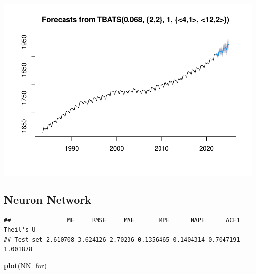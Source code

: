 \documentclass[
]{article}
\newenvironment{Shaded}{\begin{snugshade}}{\end{snugshade}}
\newcommand{\AttributeTok}[1]{\textcolor[rgb]{0.13,0.29,0.53}{#1}}
\newcommand{\DecValTok}[1]{\textcolor[rgb]{0.00,0.00,0.81}{#1}}
\newcommand{\FunctionTok}[1]{\textcolor[rgb]{0.13,0.29,0.53}{\textbf{#1}}}
\newcommand{\NormalTok}[1]{#1}
\newcommand{\OtherTok}[1]{\textcolor[rgb]{0.56,0.35,0.01}{#1}}
\newcommand{\SpecialCharTok}[1]{\textcolor[rgb]{0.81,0.36,0.00}{\textbf{#1}}}
\begin{document}
\includegraphics{Methane_Forecasting_files/figure-latex/unnamed-chunk-13-2.pdf}

\subsection{Neuron Network}\label{neuron-network}

\begin{Shaded}
\end{Shaded}

\begin{verbatim}
##                ME     RMSE     MAE       MPE      MAPE      ACF1 Theil's U
## Test set 2.610708 3.624126 2.70236 0.1356465 0.1404314 0.7047191  1.001878
\end{verbatim}

\begin{Shaded}
\begin{Highlighting}[]
\FunctionTok{plot}\NormalTok{(NN\_for)}
\end{Highlighting}
\end{Shaded}
\end{document}
